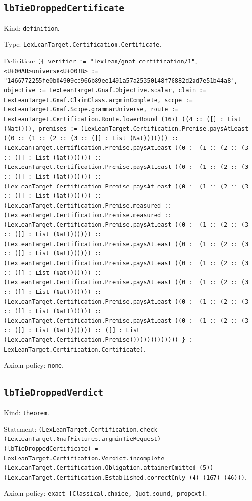 \documentclass[11pt]{article}
\begin{document}
\subsection*{\texttt{lbTieDroppedCertificate}}
\noindent Kind: \texttt{definition}.\par
\noindent Type: \texttt{LexLeanTarget.Certification.Certificate}.\par
\noindent Definition: \texttt{(\{ verifier := "lexlean/gnaf-certification/1", <U+00AB>universe<U+00BB> := "1466772255fe0b04909cc966b89ee1491a57a25350148f70882d2ad7e51b44a8", objective := LexLeanTarget.Gnaf.Objective.scalar, claim := LexLeanTarget.Gnaf.ClaimClass.argminComplete, scope := LexLeanTarget.Gnaf.Scope.grammarUniverse, route := LexLeanTarget.Certification.Route.lowerBound (167) ((4 :: ([] : List (Nat)))), premises := (LexLeanTarget.Certification.Premise.paysAtLeast ((0 :: (1 :: (2 :: (3 :: ([] : List (Nat))))))) :: (LexLeanTarget.Certification.Premise.paysAtLeast ((0 :: (1 :: (2 :: (3 :: ([] : List (Nat))))))) :: (LexLeanTarget.Certification.Premise.paysAtLeast ((0 :: (1 :: (2 :: (3 :: ([] : List (Nat))))))) :: (LexLeanTarget.Certification.Premise.paysAtLeast ((0 :: (1 :: (2 :: (3 :: ([] : List (Nat))))))) :: (LexLeanTarget.Certification.Premise.measured :: (LexLeanTarget.Certification.Premise.measured :: (LexLeanTarget.Certification.Premise.paysAtLeast ((0 :: (1 :: (2 :: (3 :: ([] : List (Nat))))))) :: (LexLeanTarget.Certification.Premise.paysAtLeast ((0 :: (1 :: (2 :: (3 :: ([] : List (Nat))))))) :: (LexLeanTarget.Certification.Premise.paysAtLeast ((0 :: (1 :: (2 :: (3 :: ([] : List (Nat))))))) :: (LexLeanTarget.Certification.Premise.paysAtLeast ((0 :: (1 :: (2 :: (3 :: ([] : List (Nat))))))) :: (LexLeanTarget.Certification.Premise.paysAtLeast ((0 :: (1 :: (2 :: (3 :: ([] : List (Nat))))))) :: (LexLeanTarget.Certification.Premise.paysAtLeast ((0 :: (1 :: (2 :: (3 :: ([] : List (Nat))))))) :: ([] : List (LexLeanTarget.Certification.Premise)))))))))))))) \} : LexLeanTarget.Certification.Certificate)}.\par
\noindent Axiom policy: \texttt{none}.\par
\subsection*{\texttt{lbTieDroppedVerdict}}
\noindent Kind: \texttt{theorem}.\par
\noindent Statement: \texttt{(LexLeanTarget.Certification.check (LexLeanTarget.GnafFixtures.argminTieRequest) (lbTieDroppedCertificate) = LexLeanTarget.Certification.Verdict.incomplete (LexLeanTarget.Certification.Obligation.attainerOmitted (5)) (LexLeanTarget.Certification.Established.correctOnly (4) (167) (46)))}.\par
\noindent Axiom policy: \texttt{exact [Classical.choice, Quot.sound, propext]}.\par
\end{document}
